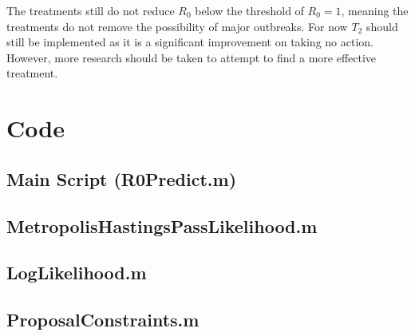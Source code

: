 \documentclass{X:/Documents/Coding/Latex/myassignment}
\begin{document}
The treatments still do not reduce $R_0$ below the threshold of $R_0 =1$, meaning the treatments do not remove the possibility of major outbreaks. For now $T_2$ should still be implemented as it is a significant improvement on taking no action. However, more research should be taken to attempt to find a more effective treatment.


\clearpage


\appendix

\printbibliography
\section{Code}
\subsection{Main Script (R0Predict.m)}


\subsection{MetropolisHastingsPassLikelihood.m}

\subsection{LogLikelihood.m}

\subsection{ProposalConstraints.m}





\end{document}
